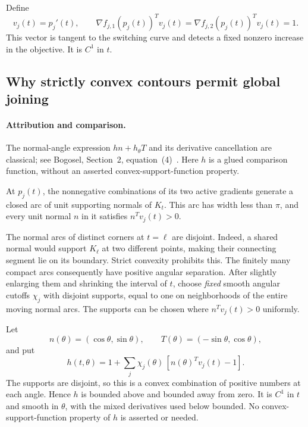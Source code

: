Define
\begin{equation}\label{C:eq:vel}
 v_j(t)=p_j'(t),\qquad
 \nabla f_{j,1}(p_j(t))^Tv_j(t)
 =\nabla f_{j,2}(p_j(t))^Tv_j(t)=1.
\end{equation}
This vector is tangent to the switching curve and detects a fixed nonzero increase in the objective. It is $C^1$ in $t$.

\subsection{Why strictly convex contours permit global joining}
\paragraph{Attribution and comparison.}
The normal-angle expression $h n+h_\theta T$ and its derivative cancellation are classical; see Bogosel, Section~2, equation~(4)~\cite{geom_Bogosel2023}. Here $h$ is a glued comparison function, without an asserted convex-support-function property.

At $p_j(t)$, the nonnegative combinations of its two active gradients generate a closed arc of unit supporting normals of $K_t$. This arc has width less than $\pi$, and every unit normal $n$ in it satisfies $n^Tv_j(t)>0$.

The normal arcs of distinct corners at $t=\ell$ are disjoint. Indeed, a shared normal would support $K_\ell$ at two different points, making their connecting segment lie on its boundary. Strict convexity prohibits this. The finitely many compact arcs consequently have positive angular separation. After slightly enlarging them and shrinking the interval of $t$, choose \emph{fixed} smooth angular cutoffs $\chi_j$ with disjoint supports, equal to one on neighborhoods of the entire moving normal arcs. The supports can be chosen where $n^Tv_j(t)>0$ uniformly.

Let
\[
 n(\theta)=(\cos\theta,\sin\theta),\qquad
 T(\theta)=(-\sin\theta,\cos\theta),
\]
and put
\begin{equation}\label{C:eq:h}
 h(t,\theta)=1+\sum_j\chi_j(\theta)\,[n(\theta)^Tv_j(t)-1].
\end{equation}
The supports are disjoint, so this is a convex combination of positive numbers at each angle. Hence $h$ is bounded above and bounded away from zero. It is $C^1$ in $t$ and smooth in $\theta$, with the mixed derivatives used below bounded. No convex-support-function property of $h$ is asserted or needed.

